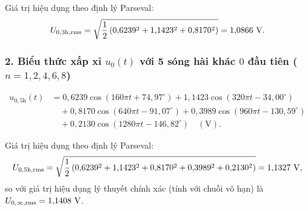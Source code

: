 Giá trị hiệu dụng theo định lý Parseval:
\begin{equation}
    U_{0,3\text{h},\text{rms}} = \sqrt{\frac{1}{2}\left(0{,}6239^2 + 1{,}1423^2 + 0{,}8170^2\right)} = 1{,}0866\text{ V}.
\end{equation}

\subsubsection*{2. Biểu thức xấp xỉ $u_0(t)$ với 5 sóng hài khác $0$ đầu tiên ($n = 1, 2, 4, 6, 8$)}
\begin{align}
    u_{0,5\text{h}}(t)
    &= 0{,}6239\cos(160\pi t + 74{,}97^\circ)
     + 1{,}1423\cos(320\pi t - 34{,}00^\circ) \nonumber\\
    &\quad + 0{,}8170\cos(640\pi t - 91{,}07^\circ)
     + 0{,}3989\cos(960\pi t - 130{,}59^\circ) \nonumber\\
    &\quad + 0{,}2130\cos(1280\pi t - 146{,}82^\circ) \quad (\text{V}).
    \label{eq:u0_5h}
\end{align}

Giá trị hiệu dụng theo định lý Parseval:
\begin{equation}
    U_{0,5\text{h},\text{rms}} = \sqrt{\frac{1}{2}\left(0{,}6239^2 + 1{,}1423^2 + 0{,}8170^2 + 0{,}3989^2 + 0{,}2130^2\right)} = 1{,}1327\text{ V},
\end{equation}
so với giá trị hiệu dụng lý thuyết chính xác (tính với chuỗi vô hạn) là $U_{0,\infty,\text{rms}} = 1{,}1408\text{ V}$.
